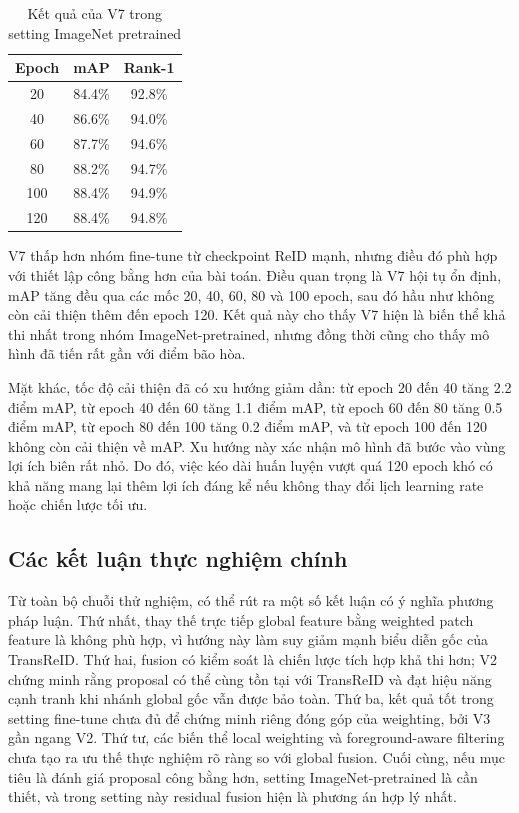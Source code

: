 \begin{table}[!h]
    \centering
    \begin{tabular}{c c c}
        \hline
        Epoch & mAP & Rank-1 \\
        \hline
        20 & 84.4\% & 92.8\% \\
        40 & 86.6\% & 94.0\% \\
        60 & 87.7\% & 94.6\% \\
        80 & 88.2\% & 94.7\% \\
        100 & 88.4\% & 94.9\% \\
        120 & 88.4\% & 94.8\% \\
        \hline
    \end{tabular}
    \caption{Kết quả của V7 trong setting ImageNet pretrained}
    \label{tab:v7_results}
\end{table}

V7 thấp hơn nhóm fine-tune từ checkpoint ReID mạnh, nhưng điều đó phù hợp với thiết lập công bằng hơn của bài toán. Điều quan trọng là V7 hội tụ ổn định, mAP tăng đều qua các mốc 20, 40, 60, 80 và 100 epoch, sau đó hầu như không còn cải thiện thêm đến epoch 120. Kết quả này cho thấy V7 hiện là biến thể khả thi nhất trong nhóm ImageNet-pretrained, nhưng đồng thời cũng cho thấy mô hình đã tiến rất gần với điểm bão hòa.

Mặt khác, tốc độ cải thiện đã có xu hướng giảm dần: từ epoch 20 đến 40 tăng 2.2 điểm mAP, từ epoch 40 đến 60 tăng 1.1 điểm mAP, từ epoch 60 đến 80 tăng 0.5 điểm mAP, từ epoch 80 đến 100 tăng 0.2 điểm mAP, và từ epoch 100 đến 120 không còn cải thiện về mAP. Xu hướng này xác nhận mô hình đã bước vào vùng lợi ích biên rất nhỏ. Do đó, việc kéo dài huấn luyện vượt quá 120 epoch khó có khả năng mang lại thêm lợi ích đáng kể nếu không thay đổi lịch learning rate hoặc chiến lược tối ưu.

\subsection{Các kết luận thực nghiệm chính}

Từ toàn bộ chuỗi thử nghiệm, có thể rút ra một số kết luận có ý nghĩa phương pháp luận. Thứ nhất, thay thế trực tiếp global feature bằng weighted patch feature là không phù hợp, vì hướng này làm suy giảm mạnh biểu diễn gốc của TransReID. Thứ hai, fusion có kiểm soát là chiến lược tích hợp khả thi hơn; V2 chứng minh rằng proposal có thể cùng tồn tại với TransReID và đạt hiệu năng cạnh tranh khi nhánh global gốc vẫn được bảo toàn. Thứ ba, kết quả tốt trong setting fine-tune chưa đủ để chứng minh riêng đóng góp của weighting, bởi V3 gần ngang V2. Thứ tư, các biến thể local weighting và foreground-aware filtering chưa tạo ra ưu thế thực nghiệm rõ ràng so với global fusion. Cuối cùng, nếu mục tiêu là đánh giá proposal công bằng hơn, setting ImageNet-pretrained là cần thiết, và trong setting này residual fusion hiện là phương án hợp lý nhất.

